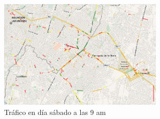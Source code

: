 \begin{figure}[!ht]
	\centering
	\includegraphics[width=0.7\textwidth]{capitulos/7/figuras/figura7.jpg}
	\caption{\label{fig:trafico_sabado} Tráfico en día sábado a las 9 am}	
\end{figure}


